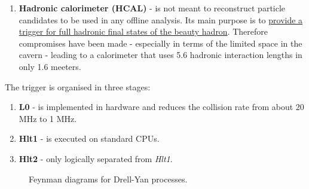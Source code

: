 \documentclass[11pt,a4paper,twoside]{article}
\begin{document}
\begin{enumerate}
\begin{enumerate}
            \item \textbf{Hadronic calorimeter (HCAL)} - is not meant to reconstruct particle candidates to be used in any offline analysis. Its main purpose is to \underline{provide a trigger for full hadronic final states of the beauty hadron}. Therefore compromises have been made - especially in terms of the limited space in the cavern - leading to a calorimeter that uses 5.6 hadronic interaction lengths in only 1.6 meeters.
        \end{enumerate}

        The trigger is organised in three stages:
        \begin{enumerate}
            \item \textbf{L0} - is implemented in hardware and reduces the collision rate from about 20 MHz to 1 MHz.
            \item \textbf{Hlt1} - is executed on standard CPUs.
            \item \textbf{Hlt2} - only logically separated from \textit{Hlt1}. 
        \end{enumerate}



        \begin{figure}[H]
            \centering

            
            \caption{Feynman diagrams for Drell-Yan processes.}
            \label{fig:001-Z_MyonAntimyon}
        \end{figure}
        

\end{enumerate}
\end{document}
